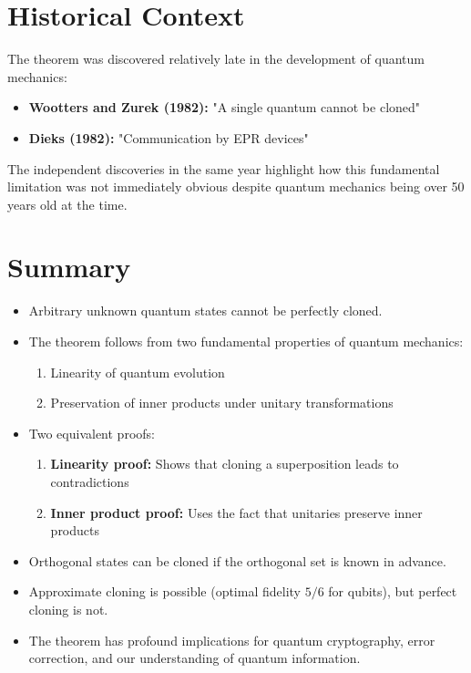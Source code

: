 \documentclass[12pt]{article}
\begin{document}
\section{Historical Context}

The theorem was discovered relatively late in the development of quantum mechanics:
\begin{itemize}
    \item \textbf{Wootters and Zurek (1982):} "A single quantum cannot be cloned"
    \item \textbf{Dieks (1982):} "Communication by EPR devices"
\end{itemize}

The independent discoveries in the same year highlight how this fundamental limitation was not immediately obvious despite quantum mechanics being over 50 years old at the time.

\section{Summary}

\begin{tcolorbox}[title=Key Takeaways]
\begin{itemize}
    \item Arbitrary unknown quantum states cannot be perfectly cloned.
    
    \item The theorem follows from two fundamental properties of quantum mechanics:
    \begin{enumerate}
        \item Linearity of quantum evolution
        \item Preservation of inner products under unitary transformations
    \end{enumerate}
    
    \item Two equivalent proofs:
    \begin{enumerate}
        \item \textbf{Linearity proof:} Shows that cloning a superposition leads to contradictions
        \item \textbf{Inner product proof:} Uses the fact that unitaries preserve inner products
    \end{enumerate}
    
    \item Orthogonal states can be cloned if the orthogonal set is known in advance.
    
    \item Approximate cloning is possible (optimal fidelity $5/6$ for qubits), but perfect cloning is not.
    
    \item The theorem has profound implications for quantum cryptography, error correction, and our understanding of quantum information.
\end{itemize}
\end{tcolorbox}
\end{document}
